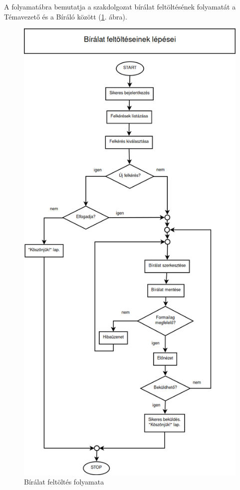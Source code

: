 \documentclass[a4paper,12pt]{article}
\begin{document}
A folyamatábra bemutatja a szakdolgozat bírálat feltöltésének folyamatát a Témavezető és a Bíráló között (\ref{fig:Biralat_Feltoltes}. ábra).

\begin{figure}
\centering
\includegraphics[scale=0.45]{images/Folyamatabra/Biralat_Feltoltes.png}
\caption{Bírálat feltöltés folyamata}
\label{fig:Biralat_Feltoltes}
\end{figure}
\end{document}
